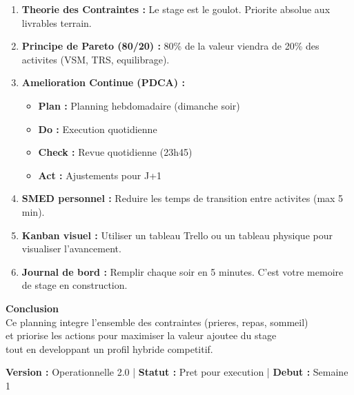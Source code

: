 \documentclass[12pt,a4paper]{article}
\begin{document}
\begin{enumerate}[leftmargin=*, label=\textbf{\arabic*.}]
    \item \textbf{Theorie des Contraintes :} Le stage est le \textcolor{riskred}{goulot}. Priorite absolue aux livrables terrain.
    
    \item \textbf{Principe de Pareto (80/20) :} 80\% de la valeur viendra de 20\% des activites (VSM, TRS, equilibrage).
    
    \item \textbf{Amelioration Continue (PDCA) :}
    \begin{itemize}
        \item \textbf{Plan :} Planning hebdomadaire (dimanche soir)
        \item \textbf{Do :} Execution quotidienne
        \item \textbf{Check :} Revue quotidienne (23h45)
        \item \textbf{Act :} Ajustements pour J+1
    \end{itemize}
    
    \item \textbf{SMED personnel :} Reduire les temps de transition entre activites (max 5 min).
    
    \item \textbf{Kanban visuel :} Utiliser un tableau Trello ou un tableau physique pour visualiser l'avancement.
    
    \item \textbf{Journal de bord :} Remplir chaque soir en 5 minutes. C'est votre memoire de stage en construction.
\end{enumerate}

\vspace{0.8cm}

\begin{center}
\begin{tcolorbox}[colback=successgreen!10, colframe=successgreen!70, width=0.85\textwidth, rounded corners]
    \centering
    \textbf{\Large Conclusion}\\[0.3cm]
    Ce planning integre l'ensemble des contraintes (prieres, repas, sommeil) \\
    et priorise les actions pour maximiser la valeur ajoutee du stage \\
    tout en developpant un profil hybride competitif.
\end{tcolorbox}
\end{center}

\vspace{0.5cm}

\begin{center}
\textbf{Version :} Operationnelle 2.0 \quad | \quad \textbf{Statut :} Pret pour execution \quad | \quad \textbf{Debut :} Semaine 1
\end{center}
\end{document}
